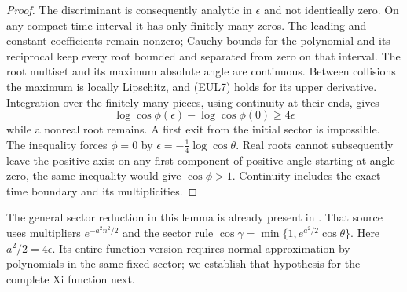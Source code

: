 \documentclass[11pt]{article}
\theoremstyle{remark}\newtheorem{remark}[theorem]{Remark}
\begin{document}
\begin{proof}
The discriminant is consequently analytic in $\epsilon$ and not
identically zero. On any compact time interval it has only finitely
many zeros. The leading and constant coefficients remain nonzero;
Cauchy bounds for the polynomial and its reciprocal keep every
root bounded and separated from zero on that interval.
The root multiset and its maximum absolute angle are continuous.
Between collisions the maximum is locally Lipschitz, and (EUL7)
holds for its upper derivative. Integration over the finitely many
pieces, using continuity at their ends, gives
\[
 \log\cos\phi(\epsilon)-\log\cos\phi(0)\ge4\epsilon
\]
while a nonreal root remains. A first exit from the initial sector
is impossible. The inequality forces $\phi=0$ by
$\epsilon=-\frac14\log\cos\theta$.
Real roots cannot subsequently leave the positive axis: on any
first component of positive angle starting at angle zero,
the same inequality would give $\cos\phi>1$.
Continuity includes the exact time boundary and its multiplicities.
\end{proof}

The general sector reduction in this lemma is already present in
\cite[Theorem 2.5 and Corollary 2.6, p.~5]{SectorReducing}.
That source uses multipliers $e^{-a^2n^2/2}$ and the sector rule
$\cos\gamma=\min\{1,e^{a^2/2}\cos\theta\}$.
Here $a^2/2=4\epsilon$. Its entire-function version requires
normal approximation by polynomials in the same fixed sector;
we establish that hypothesis for the complete Xi function next.
\end{document}
